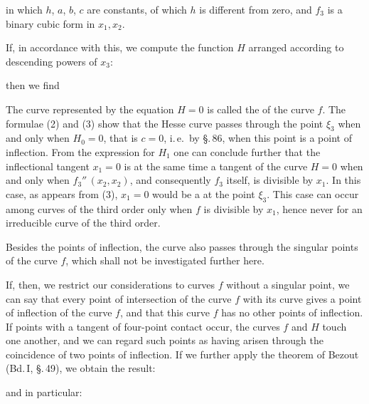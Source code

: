 in which $h$, $a$, $b$, $c$ are constants, of which $h$ is different from zero,
and $f_3$ is a binary cubic form in $x_1, x_2$.

If, in accordance with this, we compute the function $H$ arranged
according to descending powers of $x_3$:


then we find


The curve represented by the equation $H=0$ is called
the  of the curve $f$. The formulae (2) and (3)
show that the Hesse curve passes through the point $\xi_3$
when and only when $H_0=0$, that is $c=0$, i.\,e.\ by \S.\,86,
when this point is a point of inflection. From the expression
for $H_1$ one can conclude further that the inflectional tangent
$x_1=0$ is at the same time a tangent of the curve $H=0$
when and only when $f_3''\,(x_2,x_2)$, and consequently $f_3$ itself, is divisible
by $x_1$. In this case, as appears from (3), $x_1=0$ would be a
 at the point $\xi_3$. This
case can occur among curves of the third order only
when $f$ is divisible by $x_1$, hence never for an irreducible
curve of the third order.

Besides the points of inflection, the  curve also passes
through the singular points of the curve $f$, which shall not
be investigated further here.

If, then, we restrict our considerations to curves $f$ without
a singular point, we can say that every point of
intersection of the curve $f$ with its  curve gives a
point of inflection of the curve $f$, and that this curve $f$ has no
other points of inflection. If points with a tangent of four-point
contact occur, the curves $f$
and $H$ touch one another, and we can regard such points as
having arisen through the coincidence of two points of inflection. If
we further apply the theorem of Bezout (Bd.\,I, \S.\,49), we obtain
the result:

\begin{quote}
\end{quote}

and in particular:

\begin{quote}
\end{quote}
